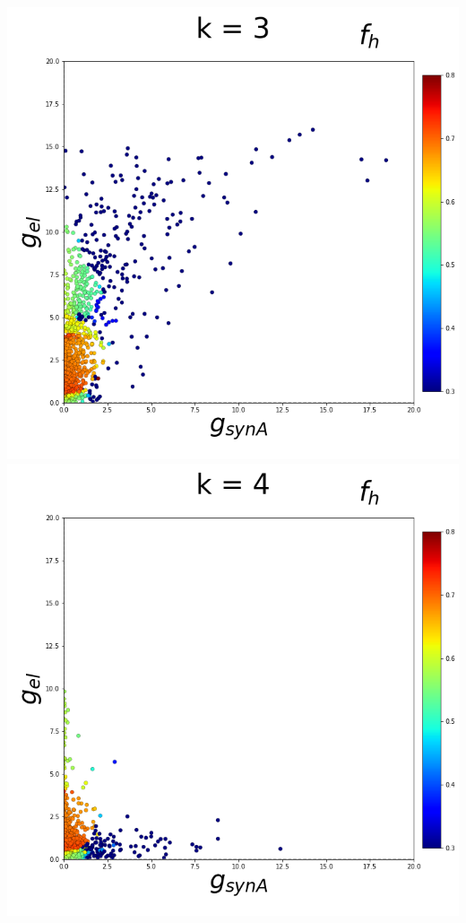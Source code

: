 \documentclass[11pt]{article}
\begin{document}
\begin{center}
\includegraphics[scale=0.125]{DSN_figs/STGCircuit_DSN_c=2_rs=2_k=3.png}
\includegraphics[scale=0.125]{DSN_figs/STGCircuit_DSN_c=2_rs=2_k=4.png}

\end{center}
\end{document}
